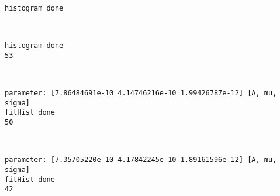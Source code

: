 \documentclass[11pt]{article}
\begin{document}
    \begin{Verbatim}[commandchars=\\\{\}]
histogram done

    \end{Verbatim}

    \begin{center}
    \end{center}
    { \hspace*{\fill} \\}
    
    \begin{Verbatim}[commandchars=\\\{\}]
histogram done
53

    \end{Verbatim}

    \begin{center}
    \end{center}
    { \hspace*{\fill} \\}
    
    \begin{Verbatim}[commandchars=\\\{\}]
parameter: [7.86484691e-10 4.14746216e-10 1.99426787e-12] [A, mu, sigma]
fitHist done
50

    \end{Verbatim}

    \begin{center}
    \end{center}
    { \hspace*{\fill} \\}
    
    \begin{Verbatim}[commandchars=\\\{\}]
parameter: [7.35705220e-10 4.17842245e-10 1.89161596e-12] [A, mu, sigma]
fitHist done
42

    \end{Verbatim}

    \begin{center}
    \end{center}
    { \hspace*{\fill} \\}
    
\end{document}
